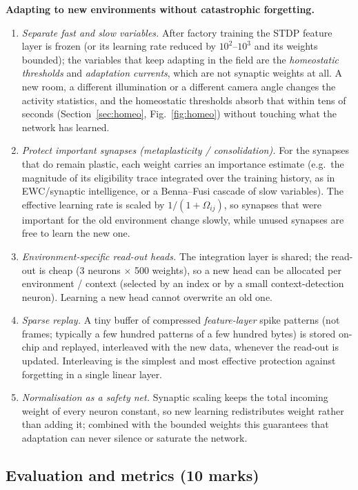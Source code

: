 \documentclass[11pt,a4paper]{article}
\begin{document}
\textbf{Adapting to new environments without catastrophic forgetting.}
\begin{enumerate}
\item \emph{Separate fast and slow variables.} After factory training the STDP feature layer is frozen (or its learning rate reduced by $10^{2}$--$10^{3}$ and its weights bounded); the variables that keep adapting in the field are the \emph{homeostatic thresholds} and \emph{adaptation currents}, which are not synaptic weights at all. A new room, a different illumination or a different camera angle changes the activity statistics, and the homeostatic thresholds absorb that within tens of seconds (Section~\ref{sec:homeo}, Fig.~\ref{fig:homeo}) without touching what the network has learned.
\item \emph{Protect important synapses (metaplasticity / consolidation).} For the synapses that do remain plastic, each weight carries an importance estimate (e.g.\ the magnitude of its eligibility trace integrated over the training history, as in EWC/synaptic intelligence, or a Benna--Fusi cascade of slow variables). The effective learning rate is scaled by $1/(1+\Omega_{ij})$, so synapses that were important for the old environment change slowly, while unused synapses are free to learn the new one.
\item \emph{Environment-specific read-out heads.} The integration layer is shared; the read-out is cheap (3 neurons $\times$ 500 weights), so a new head can be allocated per environment / context (selected by an index or by a small context-detection neuron). Learning a new head cannot overwrite an old one.
\item \emph{Sparse replay.} A tiny buffer of compressed \emph{feature-layer} spike patterns (not frames; typically a few hundred patterns of a few hundred bytes) is stored on-chip and replayed, interleaved with the new data, whenever the read-out is updated. Interleaving is the simplest and most effective protection against forgetting in a single linear layer.
\item \emph{Normalisation as a safety net.} Synaptic scaling keeps the total incoming weight of every neuron constant, so new learning redistributes weight rather than adding it; combined with the bounded weights this guarantees that adaptation can never silence or saturate the network.
\end{enumerate}

\subsection{Evaluation and metrics (10 marks)}
\end{document}
